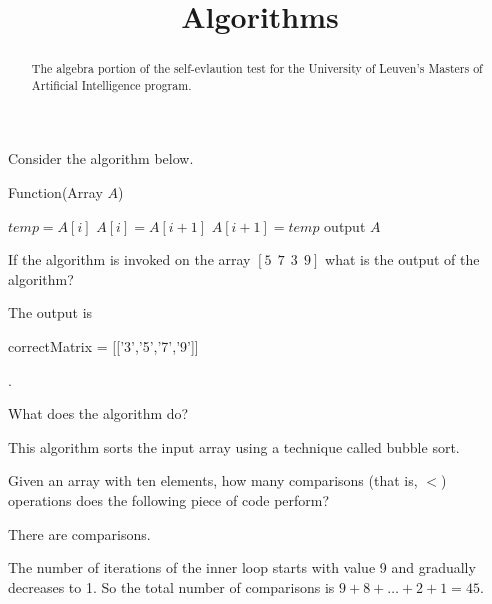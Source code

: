 \documentclass{ximera}
\title{Algorithms}
\begin{document}
\begin{abstract}
The algebra portion of the self-evlaution test for the University
of Leuven's Masters of Artificial Intelligence program.
\end{abstract}
\maketitle

\begin{question}
Consider the algorithm below.
\begin{algorithm}
\caption{Function(Array $A$)}
\begin{algorithmic}
  \STATE $temp = A[i]$
  \STATE $A[i] = A[i+1]$
  \STATE $A[i+1] = temp$
  \ENDIF
  \ENDFOR
  \ENDFOR
  \STATE output $A$
\end{algorithmic}
\end{algorithm}

If the algorithm is invoked on the array $[ 5~~ 7~~ 3~~ 9]$ what is the output of the algorithm?
\begin{solution}
The output is 
\begin{matrix-answer}[name=M]
    correctMatrix = [['3','5','7','9']]
\end{matrix-answer}
.
\end{solution}

What does the algorithm do? 
\begin{free-response}
\end{free-response}
This algorithm sorts the input array using a technique called bubble sort.

Given an array with ten elements, how many comparisons (that is, $<$)
operations does the following piece of code perform?
\begin{solution}
There are  comparisons.
\end{solution}  
The number of iterations of the inner loop starts with value 9 and
gradually decreases to 1. So the total number of comparisons is $ 9 +
8 + \ldots + 2 + 1 = 45$.


\end{question}
\end{document}
